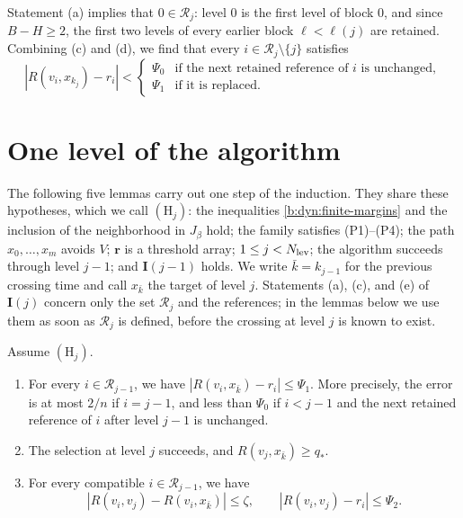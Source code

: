 Statement (a) implies that $0\in\mathcal R_j$: level $0$ is the first level of block $0$, and since $B-H\ge2$, the first two levels of every earlier block ${\ell}<{\ell}(j)$ are retained. Combining (c) and (d), we find that every $i\in\mathcal R_j\setminus\{j\}$ satisfies
\begin{equation}\label{eq:ind-target-error}
 |R(v_i,x_{k_j})-r_i|<
 \begin{cases}
 \Psi_0&\text{if the next retained reference of $i$ is unchanged},\\
 \Psi_1&\text{if it is replaced}.
 \end{cases}
\end{equation}

\section{One level of the algorithm}\label{b:sec:dyn-anchors}

The following five lemmas carry out one step of the induction. They share these hypotheses, which we call $(\mathrm H_j)$: the inequalities \eqref{b:dyn:finite-margins} and the inclusion of the neighborhood in $J_\beta$ hold; the family satisfies (P1)--(P4); the path $x_0,\dots,x_m$ avoids $V$; $\mathbf r$ is a threshold array; $1\le j<N_{\rm lev}$; the algorithm succeeds through level $j-1$; and $\mathbf I(j-1)$ holds. We write ${\bar k}=k_{j-1}$ for the previous crossing time and call $x_{\bar k}$ the target of level $j$. Statements (a), (c), and (e) of $\mathbf I(j)$ concern only the set $\mathcal R_j$ and the references; in the lemmas below we use them as soon as $\mathcal R_j$ is defined, before the crossing at level $j$ is known to exist.

\begin{lemma}\label{lem:ind-transfer}
Assume $(\mathrm H_j)$.
\begin{enumerate}[label=(\alph*)]
\item For every $i\in\mathcal R_{j-1}$, we have $|R(v_i,x_{\bar k})-r_i|\le\Psi_1$. More precisely, the error is at most $2/n$ if $i=j-1$, and less than $\Psi_0$ if $i<j-1$ and the next retained reference of $i$ after level $j-1$ is unchanged.
\item The selection at level $j$ succeeds, and $R(v_j,x_{\bar k})\ge q_*$.
\item For every compatible $i\in\mathcal R_{j-1}$, we have
\begin{equation}\label{b:dyn:target-transfer}
 |R(v_i,v_j)-R(v_i,x_{\bar k})|\le\zeta,\qquad |R(v_i,v_j)-r_i|\le\Psi_2.
\end{equation}
\end{enumerate}
\end{lemma}

